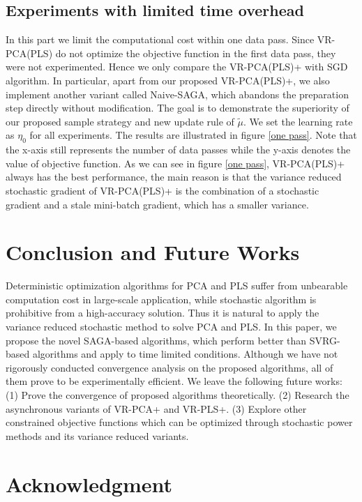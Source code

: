 \documentclass[runningheads,a4paper]{llncs}
\begin{document}
 \subsection{Experiments with limited time overhead}
 In this part we limit the computational cost within one data pass. Since VR-PCA(PLS) do not optimize the objective function in the first data pass, they were not experimented. Hence we only compare the VR-PCA(PLS)+ with SGD algorithm. In particular, apart from our proposed VR-PCA(PLS)+, we also implement another variant called Naive-SAGA, which abandons the preparation step directly without modification. The goal is to demonstrate the superiority of our proposed sample strategy and new update rule of $\tilde{\mu}$.
 We set the learning rate as $\eta_0$ for all experiments.
 The results are illustrated in figure \ref{one pass}.  Note that the x-axis still represents the number of data passes while the y-axis denotes the value of objective function. As we can see in figure \ref{one pass}, VR-PCA(PLS)+ always has the best performance, the main reason is that the variance reduced stochastic gradient of VR-PCA(PLS)+ is the combination of a stochastic gradient and a stale mini-batch gradient, which has a smaller variance.

 


\section{Conclusion and Future Works}
\label{discussion}
Deterministic optimization algorithms for PCA and PLS suffer from unbearable computation cost in large-scale application, while stochastic algorithm is prohibitive from a high-accuracy solution. Thus it is natural to apply the variance reduced stochastic method to solve PCA and PLS. In this paper, we propose the novel
SAGA-based algorithms, which perform better than SVRG-based algorithms and apply to time limited conditions. 
Although we have not rigorously conducted convergence analysis on the proposed algorithms, all of them prove to be experimentally efficient.
We leave the following future works: (1) Prove the convergence of proposed algorithms theoretically. (2) Research the asynchronous variants of VR-PCA+ and VR-PLS+. (3) Explore other constrained objective functions which can be optimized through stochastic power methods and its variance reduced variants.



\section*{Acknowledgment}







%


\end{document}
